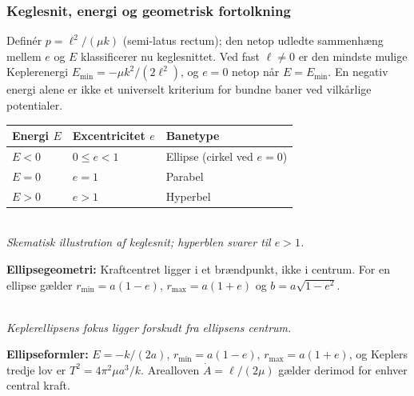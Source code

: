 \subsubsection*{Keglesnit, energi og geometrisk fortolkning}
Definér $p=\ell^2/(\mu k)$ (semi-latus rectum); den netop udledte sammenhæng mellem $e$ og $E$ klassificerer nu keglesnittet.
Ved fast $\ell\neq0$ er den mindste mulige Keplerenergi $E_{\min}=-\mu k^2/(2\ell^2)$, og $e=0$ netop når $E=E_{\min}$. En negativ energi alene er ikke et universelt kriterium for bundne baner ved vilkårlige potentialer.
\begin{center}\small\renewcommand{\arraystretch}{1.18}\begin{tabular}{lll}\toprule Energi $E$ & Excentricitet $e$ & Banetype\\\midrule
$E<0$ & $0\le e<1$ & Ellipse (cirkel ved $e=0$)\\
$E=0$ & $e=1$ & Parabel\\
$E>0$ & $e>1$ & Hyperbel\\\bottomrule\end{tabular}\end{center}
\begin{center}\\[-1mm]{\small\itshape Skematisk illustration af keglesnit; hyperblen svarer til $e>1$.}\end{center}
\textbf{Ellipsegeometri:} Kraftcentret ligger i et brændpunkt, ikke i centrum. For en ellipse gælder $r_{\min}=a(1-e)$, $r_{\max}=a(1+e)$ og $b=a\sqrt{1-e^2}$.
\begin{center}\\{\small\itshape Keplerellipsens fokus ligger forskudt fra ellipsens centrum.}\end{center}
\textbf{Ellipseformler:} $E=-k/(2a)$, $r_{\min}=a(1-e)$, $r_{\max}=a(1+e)$, og Keplers tredje lov er $T^2=4\pi^2\mu a^3/k$. Arealloven $\dot A=\ell/(2\mu)$ gælder derimod for enhver central kraft.


